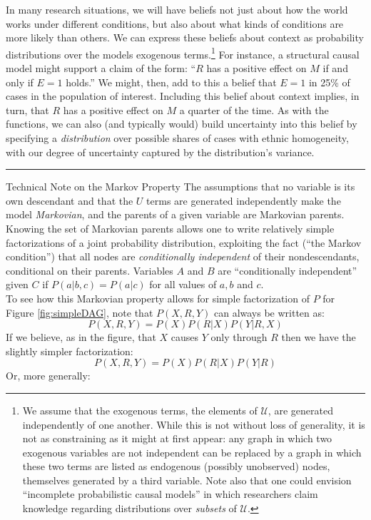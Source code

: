 \documentclass[12pt,]{book}
\let\rmarkdownfootnote\footnote%
\def\footnote{\protect\rmarkdownfootnote}
\begin{document}
In many research situations, we will have beliefs not just about how the world works under different conditions, but also about what kinds of conditions are more likely than others. We can express these beliefs about context as probability distributions over the models exogenous terms.\footnote{We assume that the exogenous terms, the elements of \(\mathcal{U}\), are generated independently of one another. While this is not without loss of generality, it is not as constraining as it might at first appear: any graph in which two exogenous variables are not independent can be replaced by a graph in which these two terms are listed as endogenous (possibly unobserved) nodes, themselves generated by a third variable. Note also that one could envision ``incomplete probabilistic causal models'' in which researchers claim knowledge regarding distributions over \emph{subsets} of \(\mathcal{U}\).} For instance, a structural causal model might support a claim of the form: ``\(R\) has a positive effect on \(M\) if and only if \(E=1\) holds.'' We might, then, add to this a belief that \(E=1\) in 25\% of cases in the population of interest. Including this belief about context implies, in turn, that \(R\) has a positive effect on \(M\) a quarter of the time. As with the functions, we can also (and typically would) build uncertainty into this belief by specifying a \emph{distribution} over possible shares of cases with ethnic homogeneity, with our degree of uncertainty captured by the distribution's variance.

\begin{center}\rule{0.5\linewidth}{\linethickness}\end{center}

Technical Note on the Markov Property
The assumptions that no variable is its own descendant and that the \(U\) terms are generated independently make the model \emph{Markovian}, and the parents of a given variable are Markovian parents. Knowing the set of Markovian parents allows one to write relatively simple factorizations of a joint probability distribution, exploiting the fact (``the Markov condition'') that all nodes are \emph{conditionally independent} of their nondescendants, conditional on their parents. Variables \(A\) and \(B\) are ``conditionally independent'' given \(C\) if \(P(a|b,c) = P(a|c)\) for all values of \(a, b\) and \(c\).\\
To see how this Markovian property allows for simple factorization of \(P\) for Figure \ref{fig:simpleDAG}, note that \(P(X, R, Y)\) can always be written as:
\[P(X, R, Y) = P(X)P(R|X)P(Y|R, X)\]
If we believe, as in the figure, that \(X\) causes \(Y\) only through \(R\) then we have the slightly simpler factorization:
\[P(X, R, Y) = P(X)P(R|X)P(Y|R)\]
Or, more generally:
\end{document}
